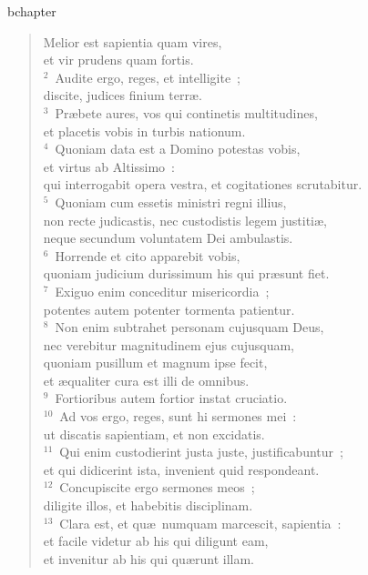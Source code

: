 bchapter\begin{flushleft}\begin{verse}\vspace{-19pt}Melior est sapientia quam vires,\\ et vir prudens quam fortis.\\
${}^{2}$~Audite ergo, reges, et intelligite~;\\ discite, judices finium terr\ae .\\
${}^{3}$~Pr\ae bete aures, vos qui continetis multitudines,\\ et placetis vobis in turbis nationum.\\
${}^{4}$~Quoniam data est a Domino potestas vobis,\\ et virtus ab Altissimo~:\\ qui interrogabit opera vestra, et cogitationes scrutabitur.\\
${}^{5}$~Quoniam cum essetis ministri regni illius,\\ non recte judicastis, nec custodistis legem justiti\ae ,\\ neque secundum voluntatem Dei ambulastis.\\
${}^{6}$~Horrende et cito apparebit vobis,\\ quoniam judicium durissimum his qui pr\ae sunt fiet.\\
${}^{7}$~Exiguo enim conceditur misericordia~;\\ potentes autem potenter tormenta patientur.\\
${}^{8}$~Non enim subtrahet personam cujusquam Deus,\\ nec verebitur magnitudinem ejus cujusquam,\\ quoniam pusillum et magnum ipse fecit,\\ et \ae qualiter cura est illi de omnibus.\\
${}^{9}$~Fortioribus autem fortior instat cruciatio.\\
${}^{10}$~Ad vos ergo, reges, sunt hi sermones mei~:\\ ut discatis sapientiam, et non excidatis.\\
${}^{11}$~Qui enim custodierint justa juste, justificabuntur~;\\ et qui didicerint ista, invenient quid respondeant.\\
${}^{12}$~Concupiscite ergo sermones meos~;\\ diligite illos, et habebitis disciplinam.\\
${}^{13}$~Clara est, et qu\ae\ numquam marcescit, sapientia~:\\ et facile videtur ab his qui diligunt eam,\\ et invenitur ab his qui qu\ae runt illam.\\

\end{verse}
\end{flushleft}

